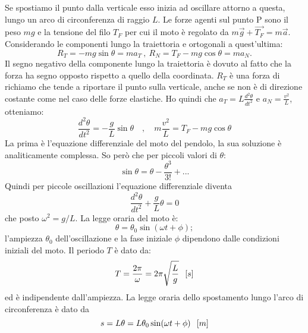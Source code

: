 \documentclass[class=book, crop=false, oneside, 12pt]{standalone}
\begin{document}
Se spostiamo il punto dalla verticale esso inizia ad oscillare attorno a questa, lungo un arco di circonferenza di raggio \(L\).
Le forze agenti sul punto P sono il peso \( m g\) e la tensione del filo \(T_F\) per cui il moto è regolato da \(m \overrightarrow{g} + \overrightarrow{T_F} = m \overrightarrow{a}\).
Considerando le componenti lungo la traiettoria e ortogonali a quest'ultima:
\begin{equation*}
    R_T = -mg \sin \theta = m a_T \ , \ R_N = T_F - mg \cos \theta = m a_N .
\end{equation*}
Il segno negativo della componente lungo la traiettoria è dovuto al fatto che  la forza ha segno opposto rispetto a quello della coordinata.
\(R_T\) è una forza di richiamo che tende a riportare il punto sulla verticale, anche se non è di direzione costante come nel caso delle forze elastiche.\newline
Ho quindi che \(a_T = L \frac {d^2 \theta} {dt^2}\) e \(a_N = \frac {v^2}{L}\), otteniamo:
\begin{equation*}
    \frac{d^{2} \theta}{d t^{2}}=-\frac{g}{L} \sin \theta \quad, \quad m \frac{v^{2}}{L}=T_{F}-m g \cos \theta
\end{equation*}
La prima è l'equazione differenziale del moto del pendolo, la sua soluzione è analiticamente complessa.
So però che per piccoli valori di \(\theta\):
\begin{equation*}
    \sin \theta = \theta - \frac {\theta^3} {3!} + ...
\end{equation*}
Quindi per piccole oscillazioni l'equazione differenziale diventa
\begin{equation*}
    \frac{d^2 \theta}{dt^2} + \frac{g}{L} \theta = 0
\end{equation*}
che posto \(\omega^2 = g/L\).\newline
La legge oraria del moto è:
\begin{equation}
    \theta = \theta_0 \sin (\omega t + \phi) ;
\end{equation}
l'ampiezza \(\theta_0\) dell'oscillazione e la fase iniziale \(\phi\) dipendono dalle condizioni iniziali del moto.\newline
Il periodo \(T\) è dato da:
\begin{equation}
    T = \frac{2 \pi}{ \omega} = 2 \pi \sqrt{\frac{L}{g}} \hspace{0.2cm} \left[s\right]
\end{equation}
ed è indipendente dall'ampiezza.\newline
La legge oraria dello spostamento lungo l'arco di circonferenza è dato da
\begin{equation*}
    s = L \theta = L \theta_0 \sin (\omega t + \phi) \hspace{0.2cm} \left[m\right]
\end{equation*}
\end{document}
